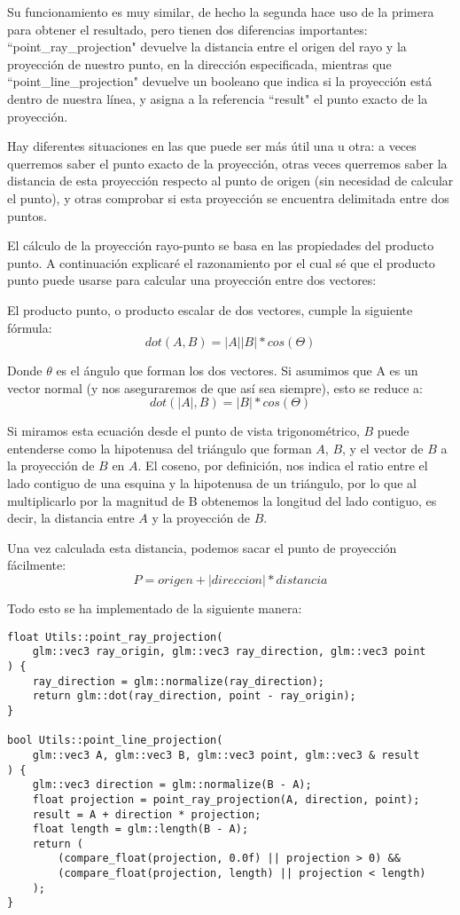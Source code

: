 Su funcionamiento es muy similar, de hecho la segunda hace uso de la primera para obtener el resultado, pero tienen dos diferencias importantes: ``point\_ray\_projection" devuelve la distancia entre el origen del rayo y la proyección de nuestro punto, en la dirección especificada, mientras que ``point\_line\_projection" devuelve un booleano que indica si la proyección está dentro de nuestra línea, y asigna a la referencia ``result" el punto exacto de la proyección.

Hay diferentes situaciones en las que puede ser más útil una u otra: a veces querremos saber el punto exacto de la proyección, otras veces querremos saber la distancia de esta proyección respecto al punto de origen (sin necesidad de calcular el punto), y otras comprobar si esta proyección se encuentra delimitada entre dos puntos.

El cálculo de la proyección rayo-punto se basa en las propiedades del producto punto. A continuación explicaré el razonamiento por el cual sé que el producto punto puede usarse para calcular una proyección entre dos vectores:

El producto punto, o producto escalar de dos vectores, cumple la siguiente fórmula:
\[ dot(A,B) = |A||B|*cos(\Theta) \]

Donde $\theta$ es el ángulo que forman los dos vectores. Si asumimos que A es un vector normal (y nos aseguraremos de que así sea siempre), esto se reduce a:
\[ dot(|A|,B) = |B|*cos(\Theta) \]

Si miramos esta ecuación desde el punto de vista trigonométrico, $B$ puede entenderse como la hipotenusa del triángulo que forman $A$, $B$, y el vector de $B$ a la proyección de $B$ en $A$. El coseno, por definición, nos indica el ratio entre el lado contiguo de una esquina y la hipotenusa de un triángulo, por lo que al multiplicarlo por la magnitud de B obtenemos la longitud del lado contiguo, es decir, la distancia entre $A$ y la proyección de $B$.

Una vez calculada esta distancia, podemos sacar el punto de proyección fácilmente:
\[ P = origen + |direccion| * distancia \]

Todo esto se ha implementado de la siguiente manera:

\begin{lstlisting}
float Utils::point_ray_projection(
    glm::vec3 ray_origin, glm::vec3 ray_direction, glm::vec3 point
) {
	ray_direction = glm::normalize(ray_direction);
	return glm::dot(ray_direction, point - ray_origin);
}

bool Utils::point_line_projection(
    glm::vec3 A, glm::vec3 B, glm::vec3 point, glm::vec3 & result
) {
	glm::vec3 direction = glm::normalize(B - A);
	float projection = point_ray_projection(A, direction, point);
	result = A + direction * projection;
	float length = glm::length(B - A);
	return (
		(compare_float(projection, 0.0f) || projection > 0) && 
		(compare_float(projection, length) || projection < length)
	);
}
\end{lstlisting}

